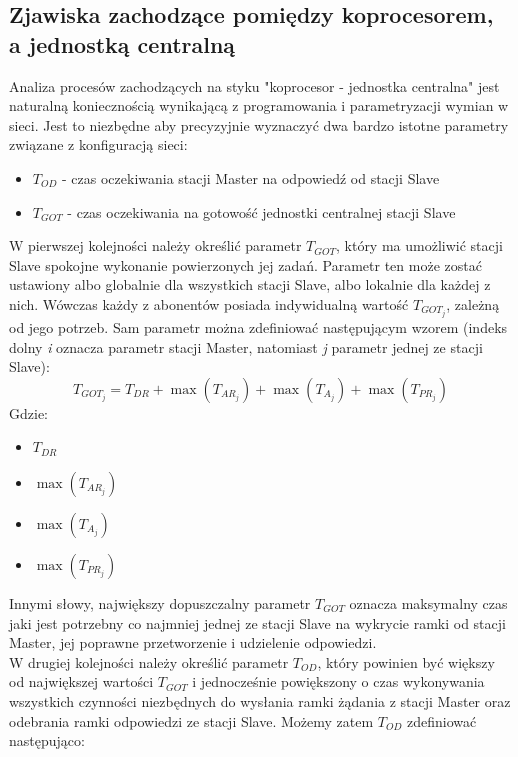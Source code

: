 \documentclass[a4paper,twoside]{article}
\begin{document}
	\subsection{Zjawiska zachodzące pomiędzy koprocesorem, a jednostką centralną}
	Analiza procesów zachodzących na styku "koprocesor - jednostka centralna" jest naturalną koniecznością wynikającą z programowania i parametryzacji wymian w sieci. Jest to niezbędne aby precyzyjnie wyznaczyć dwa bardzo istotne parametry związane z konfiguracją sieci:
	\begin{itemize}
		\item $ T_{OD} $ - czas oczekiwania stacji Master na odpowiedź od stacji Slave
		\item $ T_{GOT} $ - czas oczekiwania na gotowość jednostki centralnej stacji Slave
	\end{itemize}
	W pierwszej kolejności należy określić parametr $ T_{GOT} $, który ma umożliwić stacji Slave spokojne wykonanie powierzonych jej zadań. Parametr ten może zostać ustawiony albo globalnie dla wszystkich stacji Slave, albo lokalnie dla każdej z nich. Wówczas każdy z abonentów posiada indywidualną wartość $ T_{GOT_j} $, zależną od jego potrzeb. Sam parametr można zdefiniować następującym wzorem (indeks dolny \emph{i} oznacza parametr stacji Master, natomiast \emph{j} parametr jednej ze stacji Slave):
	$$ T_{GOT_j} = T_{DR} + \max{(T_{AR_j})} + \max{( T_{A_j} )} + \max{( T_{PR_j} )} $$
	Gdzie:
	\begin{itemize}
		\item $ T_{DR} $ \tab\tab{- czas detekcji ramki}
		\item $ \max{(T_{AR_j})} $ 
		\item $ \max{( T_{A_j} )} $ 
		\item $ \max{( T_{PR_j} )} $ 
	\end{itemize}
	Innymi słowy, największy dopuszczalny parametr $ T_{GOT} $ oznacza maksymalny czas jaki jest potrzebny co najmniej jednej ze stacji Slave na wykrycie ramki od stacji Master, jej poprawne przetworzenie i udzielenie odpowiedzi.\\
	W drugiej kolejności należy określić parametr $ T_{OD} $, który powinien być większy od największej wartości $ T_{GOT} $ i jednocześnie powiększony o czas wykonywania wszystkich czynności niezbędnych do wysłania ramki żądania z stacji Master oraz odebrania ramki odpowiedzi ze stacji Slave. Możemy zatem $ T_{OD} $ zdefiniować następująco:
\end{document}
